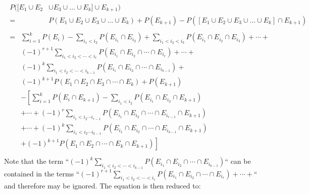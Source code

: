 \documentclass[a4paper]{article}
\begin{document}
    \begin{align}
        \begin{split}
            P([E_1 \cup E_2 &\cup E_3 \cup \dots \cup E_k] \cup E_{k + 1}) \\
            = & P(E_1 \cup E_2 \cup E_3 \cup \dots \cup E_k) + P(E_{k + 1}) - P([E_1 \cup E_2 \cup E_3 \cup \dots \cup E_k] \cap E_{k + 1})
        \end{split} \\
        \begin{split}
            = & \sum_{i = 1}^{k} P(E_i) - \sum_{i_1 < i_2} P(E_{i_1} \cap E_{i_2}) + \sum_{i_1 < i_2 < i_3} P(E_{i_1} \cap E_{i_2} \cap E_{i_3}) + \cdots + \\
            & {(-1)}^{r + 1} \sum_{i_1 < i_2 < \cdots < i_r} P(E_{i_1} \cap E_{i_2} \cap \cdots \cap E_{i_r}) + \cdots + \\
            & {(-1)}^{k} \sum_{i_1 < i_2 < \cdots < i_{k-1}} P(E_{i_1} \cap E_{i_2} \cap \cdots \cap E_{i_{k-1}}) + \\
            & {(-1)}^{k + 1} P(E_1 \cap E_2 \cap E_3 \cap \cdots \cap E_k) + P(E_{k + 1}) \\
            & - \left[ \sum_{i = 1}^{k} P(E_i \cap E_{k + 1}) - \sum_{i_1 < i_2} P(E_{i_1} \cap E_{i_2} \cap E_{k + 1}) \right. \\
            & \left. + \cdots + {(-1)}^{r} \sum_{i_1 < i_2 \cdots i_{r - 1}} P(E_{i_1} \cap E_{i_2} \cap \cdots \cap E_{i_{r - 1}} \cap E_{k + 1}) \right. \\
            & \left. + \cdots + {(-1)}^{k} \sum_{i_1 < i_2 \cdots i_{k - 1}} P(E_{i_1} \cap E_{i_2} \cap \cdots \cap E_{i_{k - 1}} \cap E_{k + 1}) \right. \\
            & \left. + {(-1)}^{k + 1} P(E_1 \cap E_2 \cap \cdots \cap E_k \cap E_{k + 1}) \right] \\
        \end{split}
    \end{align}
    Note that the term ``${(-1)}^{k} \sum_{i_1 < i_2 < \cdots < i_{k-1}} P(E_{i_1} \cap E_{i_2} \cap \cdots \cap E_{i_{k-1}})$`` can be contained in the terms ``${(-1)}^{r + 1} \sum_{i_1 < i_2 < \cdots < i_r} P(E_{i_1} \cap E_{i_2} \cap \cdots \cap E_{i_r}) + \cdots +$`` and therefore may be ignored. The equation is then reduced to:
\end{document}
